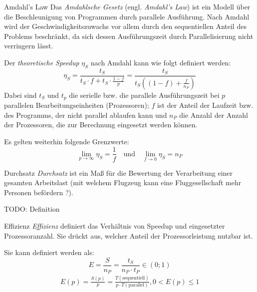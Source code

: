 \begin{defi}{Amdahl's Law}
    Das \emph{Amdahlsche Gesetz} (engl. \emph{Amdahl's Law}) ist ein Modell über die Beschleunigung von Programmen durch parallele Ausführung.
    Nach Amdahl wird der Geschwindigkeitszuwachs vor allem durch den sequentiellen Anteil des Problems beschränkt, da sich dessen Ausführungszeit durch Parallelisierung nicht verringern lässt.

    Der \emph{theoretische Speedup} $\eta_S$ nach Amdahl kann wie folgt definiert werden:
    \[
        \eta_S = \frac{t_S}{t_S \cdot f + t_S \cdot \frac{1-f}{p} } = \frac{t_S}{t_S \left((1 - f) + \frac{f}{n_P}\right)}
    \]
    Dabei sind $t_S$ und $t_p$ die serielle bzw. die parallele Ausführungszeit bei $p$ parallelen Bearbeitungseinheiten (Prozessoren);
    $f$ ist der Anteil der Laufzeit bzw. des Programms, der nicht parallel ablaufen kann und $n_P$ die Anzahl der Anzahl der Prozessoren, die zur Berechnung eingesetzt werden können.

    Es gelten weiterhin folgende Grenzwerte:
    \[
        \lim_{p \to \infty} \eta_S = \frac{1}{f} \quad \text{und} \quad \lim_{f \to 0 } \eta_S = n_P
    \]
\end{defi}

\begin{bonus}{Durchsatz}
    \emph{Durchsatz} ist ein Maß für die Bewertung der Verarbeitung einer gesamten Arbeitslast
    (mit welchem Flugzeug kann eine Fluggesellschaft mehr Personen befördern ?).

    TODO: Definition
\end{bonus}

\begin{defi}{Effizienz}
    \emph{Effizienz} definiert das Verhältnis von Speedup und eingesetzter Prozessoranzahl.
    Sie drückt aus, welcher Anteil der Prozessorleistung nutzbar ist.

    Sie kann definiert werden als:
    \[
        E = \frac{S}{n_P} = \frac{t_S}{n_P\cdot t_P} \in (0; 1)
    \]
    \begin{align*}
        E(p) = \frac{S(p)}{p} =
        \frac{T(\text{sequentiell})}{p\cdot T(\text{parallel})},
        0<E(p)\leq 1
    \end{align*}
\end{defi}

